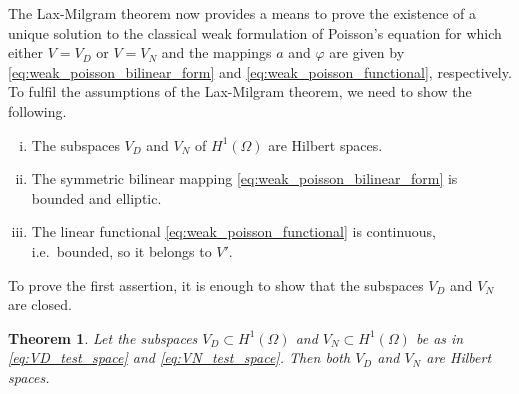 \documentclass[english, 12pt, a4paper, sci, utf8, a-2b, online]{aaltothesis}
\theoremstyle{definition}
\theoremstyle{plain}
\newtheorem{theorem}{Theorem}[section]
\numberwithin{equation}{section}
\begin{document}
The Lax-Milgram theorem now provides a means to prove the existence of
a unique solution to the classical weak formulation of Poisson's equation
for which either $V = V_D$ or $V = V_N$ and the mappings $a$ and $\varphi$ are given by
\eqref{eq:weak_poisson_bilinear_form} and \eqref{eq:weak_poisson_functional}, respectively.
To fulfil the assumptions of the Lax-Milgram theorem,
we need to show the following.
\begin{enumerate}[(i)]
    \item The subspaces $V_D$ and $V_N$ of $H^1(\Omega)$ are Hilbert spaces.
    \item The symmetric bilinear mapping \eqref{eq:weak_poisson_bilinear_form}
    is bounded and elliptic.
    \item The linear functional \eqref{eq:weak_poisson_functional}
    is continuous, i.e.\ bounded, so it belongs to $V'$.
\end{enumerate}
To prove the first assertion, it is enough to show that the subspaces $V_D$ and $V_N$ are closed.
\begin{theorem}
    \label{thm:test_spaces_are_hilbert_spaces}
    Let the subspaces $V_D \subset H^1(\Omega)$ and $V_N \subset H^1(\Omega)$
    be as in \eqref{eq:VD_test_space} and \eqref{eq:VN_test_space}.
    Then both $V_D$ and $V_N$ are Hilbert spaces.
\end{theorem}
\end{document}
